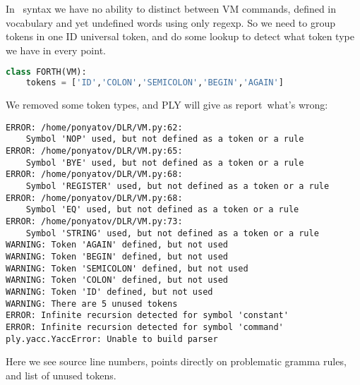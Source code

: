 In \F\ syntax we have no ability to distinct between VM commands, defined in
vocabulary and yet undefined words using only regexp. So we need to group tokens
in one ID universal token, and do some lookup to detect what token type we have
in every point.

\begin{lstlisting}[language=Python]
class FORTH(VM):
	tokens = ['ID','COLON','SEMICOLON','BEGIN','AGAIN']
\end{lstlisting}
We removed some token types, and PLY will give as report\ what's wrong:
\begin{lstlisting}
ERROR: /home/ponyatov/DLR/VM.py:62:
	Symbol 'NOP' used, but not defined as a token or a rule
ERROR: /home/ponyatov/DLR/VM.py:65:
	Symbol 'BYE' used, but not defined as a token or a rule
ERROR: /home/ponyatov/DLR/VM.py:68:
	Symbol 'REGISTER' used, but not defined as a token or a rule
ERROR: /home/ponyatov/DLR/VM.py:68:
	Symbol 'EQ' used, but not defined as a token or a rule
ERROR: /home/ponyatov/DLR/VM.py:73:
	Symbol 'STRING' used, but not defined as a token or a rule
WARNING: Token 'AGAIN' defined, but not used
WARNING: Token 'BEGIN' defined, but not used
WARNING: Token 'SEMICOLON' defined, but not used
WARNING: Token 'COLON' defined, but not used
WARNING: Token 'ID' defined, but not used
WARNING: There are 5 unused tokens
ERROR: Infinite recursion detected for symbol 'constant'
ERROR: Infinite recursion detected for symbol 'command'
ply.yacc.YaccError: Unable to build parser
\end{lstlisting}
Here we see source line numbers, points directly on problematic gramma rules,
and list of unused tokens.

